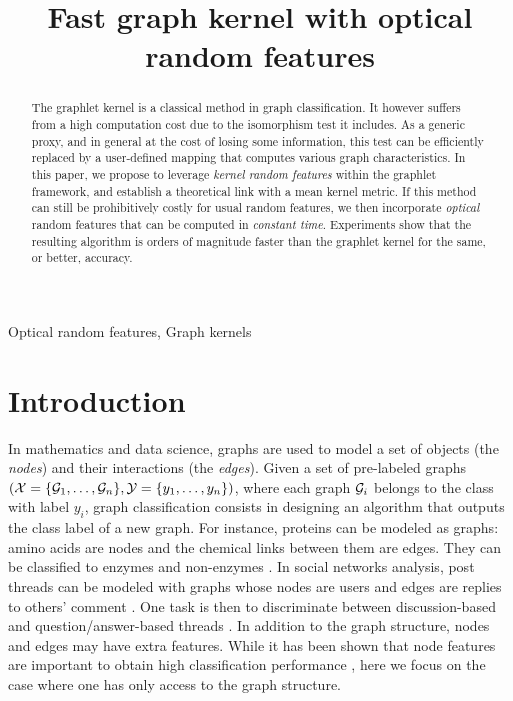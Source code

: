 \documentclass{article}
\title{Fast graph kernel with optical random features}
\begin{document}
%
\newtheorem{theorem}{Theorem} 
\maketitle
%
\begin{abstract}
The graphlet kernel is a classical method in graph classification. It however suffers from a high computation cost due to the isomorphism test it includes. As a generic proxy, and in general at the cost of losing some information, this test can be efficiently replaced by a user-defined mapping that computes various graph characteristics. In this paper, we propose to leverage \emph{kernel random features} within the graphlet framework, and establish a theoretical link with a mean kernel metric. If this method can still be prohibitively costly for usual random features, we then incorporate \emph{optical} random features that can be computed in \emph{constant time}. Experiments show that the resulting algorithm is orders of magnitude faster than the graphlet kernel for the same, or better, accuracy.
\end{abstract}
%
\begin{keywords}
Optical random features, Graph kernels
\end{keywords}
%
\section{Introduction}
\label{sec:intro}
In mathematics and data science, graphs are used to model a set of objects (the \emph{nodes}) and their interactions (the \emph{edges}). %
Given a set of pre-labeled graphs $(\mathcal{X}=\{\mathcal{G}_1,\ldots,\mathcal{G}_n\}, \mathcal{Y}=\{y_1,\ldots,y_n\})$, where each graph $\mathcal{G}_i$ belongs to the class with label $y_i$, graph classification consists in designing an algorithm that outputs the class label of a new graph.
%
For instance, proteins can be modeled as graphs: amino acids are nodes and the chemical links between them are edges. They can be classified to enzymes and non-enzymes \cite{protein_application}.
%
In social networks analysis, post threads can be modeled with graphs whose nodes are users and edges are replies to others' comment \cite{graph_soc_net}. One task is then to discriminate between discussion-based and question/answer-based threads \cite{class_Reddit}.
%
In addition to the graph structure, nodes and edges may have extra features. While it has been shown that node features are important to obtain high classification performance \cite{node_features}, here we focus on the case where one has only access to the graph structure.%
\end{document}
